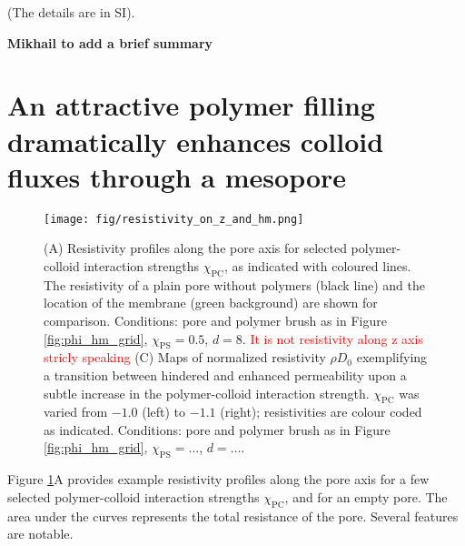 \documentclass[12pt, a4paper]{article}
\newcommand\todo[1]{\textcolor{red}{#1}}
\begin{document}
(The details are in SI).






% 
{\bf Mikhail to add a brief summary}
%


\section{An attractive polymer filling dramatically enhances colloid fluxes through a mesopore}

\begin{figure}
    \centering
    \texttt{[image: fig/resistivity\_on\_z\_and\_hm.png]}
    \caption{
    (A) Resistivity profiles along the pore axis for selected polymer-colloid interaction strengths $\chi_{\text{PC}}$, as indicated with coloured lines. 
    The resistivity of a plain pore without polymers (black line) and the location of the membrane (green background) are shown for comparison. 
    Conditions: pore and polymer brush as in Figure \ref{fig:phi_hm_grid}, $\chi_{\text{PS}}=0.5$, $d=8$. \todo{It is not resistivity along z axis stricly speaking}
    (C) Maps of normalized resistivity $\rho D_0$ exemplifying a transition between hindered and enhanced permeability upon a subtle increase in the polymer-colloid interaction strength.
    $\chi_{\text{PC}}$ was varied from $-1.0$ (left) to $-1.1$ (right); resistivities are colour coded as indicated. 
    Conditions: pore and polymer brush as in Figure \ref{fig:phi_hm_grid}, $\chi_{\text{PS}}=\dots$, $d=\dots$.
    }
    \label{fig:R_map}
\end{figure}

Figure \ref{fig:R_map}A provides example resistivity profiles along the pore axis for a few selected polymer-colloid interaction strengths $\chi_{\text{PC}}$, and for an empty pore. 
The area under the curves represents the total resistance of the pore.
Several features are notable. 
\end{document}
